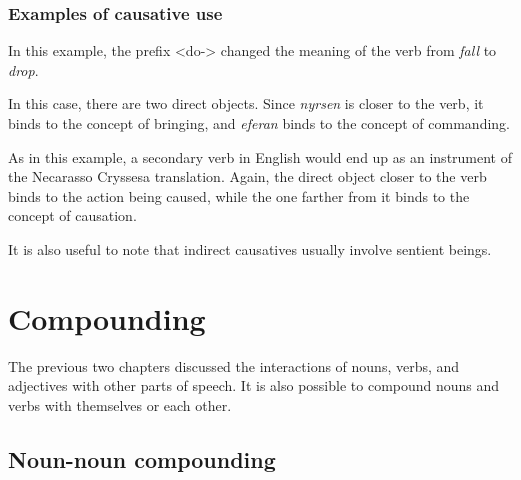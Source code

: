 \documentclass{book}
\begin{document}
\subsection{Examples of causative use}


In this example, the prefix <do-> changed the meaning of the verb from \emph{fall} to \emph{drop}.


In this case, there are two direct objects. Since \emph{nyrsen} is closer to the verb, it binds to the concept of bringing, and \emph{eferan} binds to the concept of commanding.


As in this example, a secondary verb in English would end up as an instrument of the Necarasso Cryssesa translation. Again, the direct object closer to the verb binds to the action being caused, while the one farther from it binds to the concept of causation.

It is also useful to note that indirect causatives usually involve sentient beings.




\chapter{Compounding}

The previous two chapters discussed the interactions of nouns, verbs, and adjectives with other parts of speech. It is also possible to compound nouns and verbs with themselves or each other.

\section{Noun-noun compounding}
\end{document}
